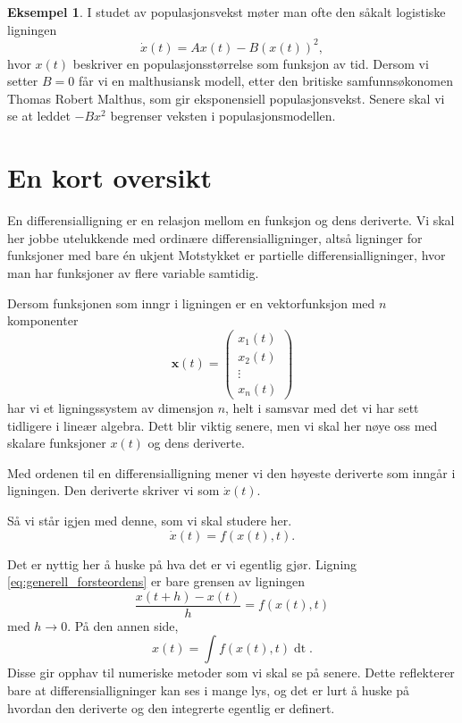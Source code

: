 \documentclass{article}
\theoremstyle{plain}
\theoremstyle{definition}
\newtheorem{eksempel}[teorem]{Eksempel}
\theoremstyle{remark}
\newcommand{\diff}[1]{\mathop{d#1}}
\newcommand{\fcn}{x}
\begin{document}
\begin{eksempel} \label{eks:populasjon_1}
    I studet av populasjonsvekst møter man ofte den såkalt logistiske ligningen
    \begin{equation*}
        \dot{x}(t) = A \fcn(t) - B (\fcn(t))^2,
    \end{equation*}
    hvor $\fcn(t)$ beskriver en populasjonsstørrelse som funksjon av tid. Dersom vi setter $B = 0$ får vi en malthusiansk modell, etter den britiske samfunnsøkonomen Thomas Robert Malthus, som gir eksponensiell populasjonsvekst. Senere skal vi se at leddet $-B x^2$ begrenser veksten i populasjonsmodellen.
\end{eksempel}


\section*{En kort oversikt}

En differensialligning er en relasjon mellom en funksjon og dens deriverte. Vi skal her jobbe utelukkende med ordinære differensialligninger, altså ligninger for funksjoner med bare én ukjent Motstykket er partielle differensialligninger, hvor man har funksjoner av flere variable samtidig.

Dersom funksjonen som inngr i ligningen er en vektorfunksjon med $n$ komponenter
\begin{equation*}
    \boldsymbol{x}(t) =
    \begin{pmatrix}
        x_1(t) \\
        x_2(t) \\
        \vdots \\
        x_n(t)
    \end{pmatrix}
\end{equation*}
har vi et ligningssystem av dimensjon $n$, helt i samsvar med det vi har sett tidligere i lineær algebra. Dett blir viktig senere, men vi skal her nøye oss med skalare funksjoner $\fcn(t)$ og dens deriverte.

Med ordenen til en differensialligning mener vi den høyeste deriverte som inngår i ligningen. Den deriverte skriver vi som $\dot{x}(t)$.


Så vi står igjen med denne, som vi skal studere her.
\begin{equation} \label{eq:generell_forsteordens}
    \dot{x}(t) = f(\fcn(t), t).
\end{equation}

Det er nyttig her å huske på hva det er vi egentlig gjør. Ligning \eqref{eq:generell_forsteordens} er bare grensen av ligningen
\begin{equation*}
    \frac{\fcn(t + h) - \fcn(t)}{h} = f(\fcn(t), t)
\end{equation*}
med $h \rightarrow 0$. På den annen side,
\begin{equation*}
    \fcn(t) = \int f(\fcn(t), t) \diff{t}.
\end{equation*}
Disse gir opphav til numeriske metoder som vi skal se på senere. Dette reflekterer bare at differensialligninger kan ses i mange lys, og det er lurt å huske på hvordan den deriverte og den integrerte egentlig er definert.
\end{document}
